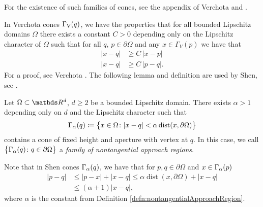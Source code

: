 For the existence of such families of cones, see the appendix of Verchota \cite{verchota} and \cite{verchota84}.

In Verchota cones $\Gamma_\mathrm{V}(q)$, we have the properties that for all bounded Lipschitz domains $\Omega$ there exists a constant $C > 0$ depending only on the Lipschitz character of $\Omega$ such that for all $q$, $p \in \partial\Omega$ and any $x \in \Gamma_V(p)$ we have that
\begin{align}
  |x - q| &\geq C\, |x - p| \label{eq:verCone1}\\ 
  |x - q| &\geq C\, |p - q|.\label{eq:verCone2}
\end{align}
For a proof, see Verchota \cite[p.\@~9f]{verchota}.
The following lemma and definition are used by Shen, see \cite[p.\@~174]{Shen2017}.

\begin{lemDefn}
  \label{defn:nontangentialApproachRegion}
  Let $\Omega \subset \R^d$, $d \geq 2$ be a bounded Lipschitz domain.
  There exists $\alpha > 1$ depending only on $d$ and the Lipschitz character such that
  \begin{align*}
     \Gamma_\alpha(q) \coloneqq \big\{ x \in \Omega \colon |x - q| < \alpha \operatorname{dist}(x, \partial\Omega) \big\}
  \end{align*}
  contains a cone of fixed height and aperture with vertex at $q$.
   In this case, we call $\big\{ \Gamma_\alpha(q) \colon q \in \partial\Omega\big\}$ a \emph{family of nontangential approach regions}.
\end{lemDefn}

  Note that in Shen cones $\Gamma_\alpha(q)$, we have that for $p, q \in \partial\Omega$ and $x \in \Gamma_\alpha(p)$
\begin{align}
  \label{eq:shenConeEstimate}
  |p - q| 
  &\leq |p - x| + |x - q| 
  \leq \alpha \operatorname{dist}(x, \partial\Omega) + |x - q|  \nonumber\\
  &\leq (\alpha + 1) |x - q|,
\end{align}
where $\alpha$ is the constant from Definition \ref{defn:nontangentialApproachRegion}. 

